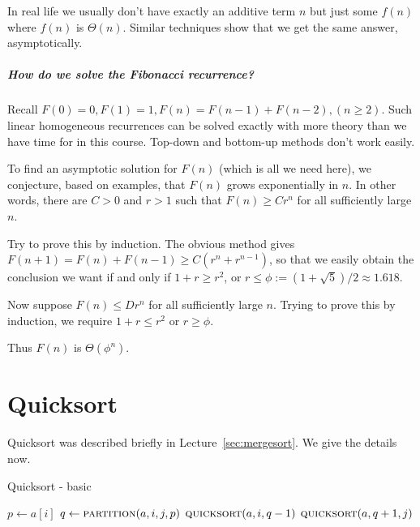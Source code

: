 In real life we usually don't have exactly an additive term $n$
but just some $f(n)$ where $f(n)$ is $\Theta(n)$. Similar techniques show that 
we get the same answer, asymptotically. 


\paragraph{How do we solve the Fibonacci recurrence?}

Recall $F(0) = 0, F(1) = 1, F(n) = F(n-1) + F(n-2), (n \geq 2)$.
Such linear homogeneous recurrences can be solved exactly with
more theory than we have time for in this course. Top-down and bottom-up methods 
don't work easily. 

To find an asymptotic solution for
$F(n)$ (which is all we need here), we conjecture, based on examples, that $F(n)$ grows
exponentially in $n$. In other words, there are $C > 0$ and $r > 1$ such that 
$F(n) \geq C r^n$ for all sufficiently large $n$.

Try to prove this by induction. The obvious method gives 
$F(n+1) = F(n) + F(n-1) \geq C(r^n + r^{n-1})$, so that we easily obtain
the conclusion we want if and only if $1 + r \geq r^2$, or $r \leq
\phi:=(1 + \sqrt{5})/2 \approx 1.618$. 

Now suppose $F(n) \leq D
r^n$ for all sufficiently large $n$. Trying to prove this by induction,
we require $1 + r \leq r^2$ or $r \geq \phi$. 

Thus $F(n)$ is $\Theta(\phi^n)$.



\chapter{Quicksort} %
\label{sec:quicksort}

Quicksort was described briefly in Lecture~\ref{sec:mergesort}. We give the details now.

\begin{algorithm}[H]
  \caption{Quicksort - basic}    
  \label{alg:quicksort}
\begin{algorithmic}[0]
			\State $p \gets a[i]$ 
			\State $q \gets  \Call{partition}{a, i,j,p}$ 
			\State $\Call{quicksort}{a,i,q-1}$ 
			\State $\Call{quicksort}{a,q+1,j}$ 
		\EndIf
	\EndFunction  
\end{algorithmic}
\end{algorithm}

